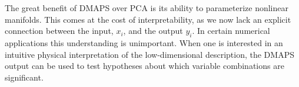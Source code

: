 
The great benefit of DMAPS over PCA is its ability to parameterize
nonlinear manifolds. This comes at the cost of interpretability, as we
now lack an explicit connection between the input, $x_i$, and the output
$y_i$. In certain numerical applications this understanding is
unimportant. When one is interested in an intuitive physical
interpretation of the low-dimensional description, the DMAPS output
can be used to test hypotheses about which variable combinations are
significant.

